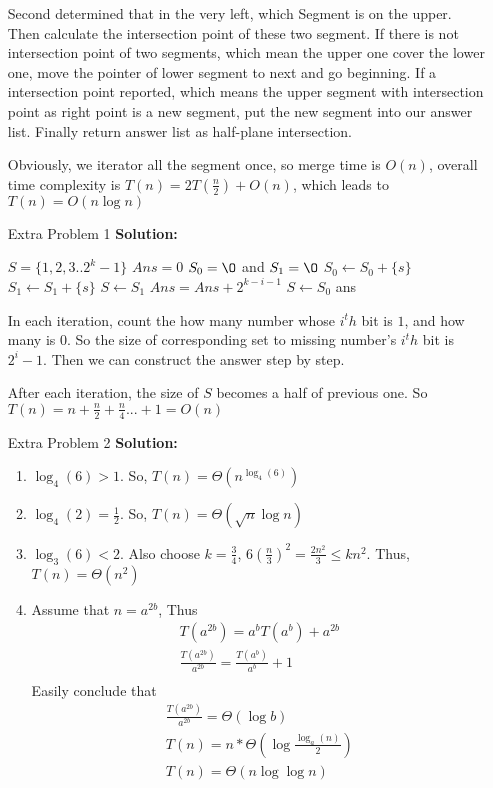 \normalfont\documentclass[letterpaper,11pt]{article}
\begin{document}
\begin{enumerate}
	Second determined that in the very left, which Segment is on the upper. Then calculate the intersection point of these two segment. If there is not intersection point of two segments, which mean the upper one cover the lower one, move the pointer of lower segment to next and go beginning. If a intersection point reported, which means the upper segment with intersection point as right point is a new segment, put the new segment into our answer list.
	Finally return answer list as half-plane intersection.\par
	Obviously, we iterator all the segment once, so merge time is $O(n)$, overall time complexity is $T(n) = 2 T(\frac{n}{2}) + O(n)$, which leads to $T(n) = O(n\log n)$
\item [Extra Problem 1]\textbf{Solution:}\par
	\begin{algorithmic}
			\State $S = \{1,2,3..2^k-1\}$
			\State $Ans = 0$
				\State $S_0 = \O$ and $S_1 = \O$
						\State $S_0 \gets S_0 + \{s\}$
					\Else
						\State $S_1 \gets S_1 + \{s\}$
					\EndIf
				\EndFor
					\State $S \gets S_1$
					\State $Ans = Ans + 2^{k-i-1}$
				\Else 
					\State $S \gets S_0$
				\EndIf 
			\EndFor
			\State \Return ans
		\EndFunction
	\end{algorithmic}
	In each iteration, count the how many number whose $i^th$ bit is $1$, and how many is $0$. So the size of corresponding set to missing number's $i^th$ bit is $2^i - 1$. Then we can construct the answer step by step.\par
	After each iteration, the size of $S$ becomes a half of previous one. So $T(n) = n + \frac{n}{2} + \frac{n}{4}... + 1 = O(n)$ 
\item [Extra Problem 2]\textbf{Solution:}\par
	\begin{enumerate}
	\item $\log_4(6) > 1$. So, $T(n) = \Theta(n^{\log_4(6)})$
	\item $\log_4(2) = \frac{1}{2}$. So, $T(n) = \Theta(\sqrt{n}\log n)$
	\item $\log_3(6) < 2$. Also choose $k = \frac{3}{4}$, $6(\frac{n}{3})^2 = \frac{2n^2}{3} \le kn^2$. Thus, $T(n) = \Theta(n^2)$
	\item Assume that $n = a ^{2b}$, Thus	
		\begin{gather*}
			T(a^{2b}) = a^{b}T(a^b) + a^{2b} \\ 
			\frac{T(a^{2b})}{a^{2b}} = \frac{T(a^{b})}{a^{b}} + 1\\
		\end{gather*}
		Easily conclude that
		\begin{gather*}
			\frac{T(a^{2b})}{a^{2b}} = \Theta(\log {b})\\
			T(n) = n * \Theta(\log {\frac{\log_a(n)}{2}})\\
			T(n) = \Theta(n\log{\log n})
		\end{gather*}
	\end{enumerate}
\end{enumerate}
\end{document}
